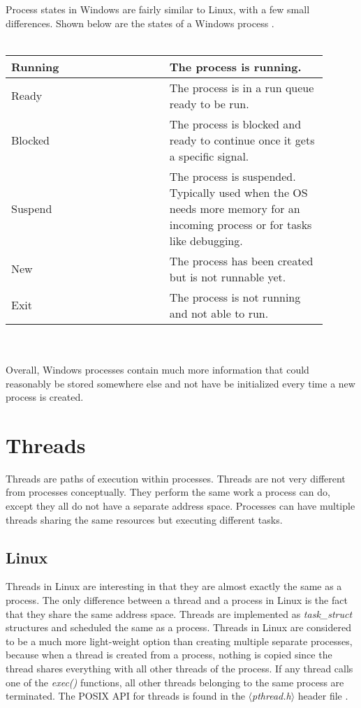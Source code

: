 \documentclass[10pt,draftclsnofoot,onecolumn,journal,compsoc]{IEEEtran}
\begin{document}
Process states in Windows are fairly similar to Linux, with a few small differences. Shown below are the states of a Windows process \cite{win_proc4}. \\ \\

\begin{tabular}{ | p{0.45\linewidth} | p{0.45\linewidth} | }
    \hline
    Running & The process is running. \\ \hline
    Ready & The process is in a run queue ready to be run. \\ \hline
    Blocked & The process is blocked and ready to continue once it gets a specific signal. \\ \hline
    Suspend & The process is suspended. Typically used when the OS needs more memory for an incoming process or for tasks like debugging. \\ \hline
    New & The process has been created but is not runnable yet. \\ \hline
    Exit & The process is not running and not able to run. \\ \hline
\end{tabular} \\ \\ 

Overall, Windows processes contain much more information that could reasonably be stored somewhere else and not have be initialized every time a new process is created.

\section{Threads}
Threads are paths of execution within processes. Threads are not very different from processes conceptually. They perform the same work a process can do, except they all do not have a separate address space. Processes can have multiple threads sharing the same resources but executing different tasks. 

\subsection{Linux}
Threads in Linux are interesting in that they are almost exactly the same as a process. The only difference between a thread and a process in Linux is the fact that they share the same address space. Threads are implemented as \textit{task\_struct} structures and scheduled the same as a process. Threads in Linux are considered to be a much more light-weight option than creating multiple separate processes, because when a thread is created from a process, nothing is copied since the thread shares everything with all other threads of the process. If any thread calls one of the \textit{exec()} functions, all other threads belonging to the same process are terminated. The POSIX API for threads is found in the \textit{$\langle$pthread.h$\rangle$} header file \cite{linux_thrd}. 
\end{document}
